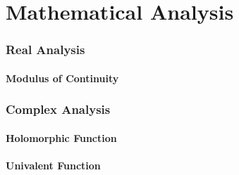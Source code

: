 \part{Mathematical Analysis}\label{sec:mathematical_analysis}

\section{Real Analysis}\label{sec:real_analysis}

\subsection{Modulus of Continuity}\label{sec:continuity_modulus}



\section{Complex Analysis}\label{sec:complex_analysis}

\subsection{Holomorphic Function}\label{sec:holomorphic_function}

\subsection{Univalent Function}\label{sec:univalent_function}

